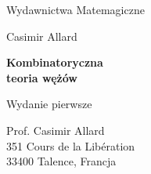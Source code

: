 

\usepackage{comment}
\usepackage{makeidx}
\usepackage{enumitem}
\usepackage{booktabs}
\usepackage{longtable}
\usepackage[table]{xcolor}
\usepackage[colorinlistoftodos,prependcaption]{todonotes}
\usepackage{tikz}
\usetikzlibrary{arrows.meta}
\usetikzlibrary{decorations.markings}
\usetikzlibrary{decorations.pathreplacing}
\usetikzlibrary{knots}



\let\oldtabular\tabular %
\let\endoldtabular\endtabular
\renewenvironment{tabular}
{\rowcolors{2}{white}{lightgray}\oldtabular}
{\endoldtabular}
\let\oldlongtable\longtable %
\let\endoldlongtable\endlongtable
\renewenvironment{longtable}
{\rowcolors{2}{white}{lightgray}\oldlongtable}
{\endoldlongtable}


\makeindex


\thispagestyle{empty}
{\noindent\fontsize{18pt}{18pt}\selectfont Wydawnictwa Matemagiczne}
\newpage

\thispagestyle{empty}
\phantom{nothing}
\newpage

\thispagestyle{empty}
{\noindent\fontsize{18pt}{18pt}\selectfont Casimir Allard}
\vspace{10mm}

{\noindent\fontsize{24pt}{24pt}\selectfont \textbf{Kombinatoryczna\\teoria wężów}}
\vspace{10mm}

{\noindent Wydanie pierwsze}
\vfill
{}
\newpage

\thispagestyle{empty}
{\noindent Prof. Casimir Allard\\
351 Cours de la Libération\\
33400 Talence, Francja}
\vspace{5mm}

